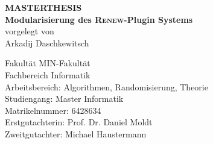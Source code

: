\usepackage{colortbl}	
\usepackage{xcolor}
\usepackage[T1]{fontenc}
\usepackage{rotating}
\usepackage{hyphenat}
\usepackage{hyphenat}
\usepackage[bottom]{footmisc}



% 
\begin{titlepage}


\vspace*{2cm}
\Large
\begin{center}
              {\color{uhhred}\textbf{{MASTERTHESIS}}}
\vspace*{2.0cm}\\
{\LARGE \textbf{Modularisierung des \textsc{Renew}-Plugin Systems}}
\vspace*{2.0cm}\\
vorgelegt von
\vspace*{0.4cm}\\
Arkadij Daschkewitsch
\end{center}
\vspace*{3.7cm}

\noindent
Fakultät MIN-Fakultät \vspace*{0.25cm} \\
Fachbereich Informatik \vspace*{0.25cm} \\
Arbeitsbereich: Algorithmen, Randomisierung, Theorie \vspace*{0.25cm} \\
Studiengang: Master Informatik \vspace*{0.25cm} \\
Matrikelnummer: 6428634\vspace*{0.5cm} \\
Erstgutachterin: Prof. Dr. Daniel Moldt \vspace*{0.25cm} \\
Zweitgutachter: Michael Haustermann               %
\end{titlepage}
